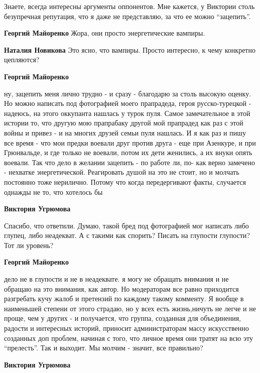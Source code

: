 \begin{itemize}
\begin{itemize}
\begin{itemize} %

Знаете, всегда интересны аргументы оппонентов. Мне кажется, у Виктории столь
безупречная репутация, что я даже не представляю, за что ее можно \enquote{зацепить}.


\textbf{Георгий Майоренко}
Жора, они просто энергетические вампиры.

\textbf{Наталия Новикова} Это ясно, что вампиры. Просто интересно, к чему конкретно цепляются?

\textbf{Георгий Майоренко} 

ну, зацепить меня лично трудно - и сразу - благодарю за столь высокую оценку.
Но можно написать под фотографией моего прапрадеда, героя русско-турецкой -
надеюсь, на этого оккупанта нашлась у турок пуля. Самое замечательное в этой
истории то, что другую мою прапрабаку другой мой прапрадед как раз с этой войны
и привез - и на многих друзей семьи пуля нашлась. И я как раз и пишу все время
- что мои предки воевали друг против друга - еще при Азенкуре, и при
Грюнвальде, и где только не воевали, потом их дети женились, а их внуки опять
воевали. Так что дело в желании зацепить - по работе ли, по- как верно замечено
- нехватке энергетической. Реагировать душой на это не стоит, но и молчать
постоянно тоже нерилично. Потому что когда передергивают факты, случается
однажды не то, что хотелось бы

\textbf{Виктория Угрюмова} 

Спасибо, что ответили. Думаю, такой бред под фотографией мог написать либо
глупец, либо неадекват. А с такими как спорить? Писать на глупости глупости?
Тот ли уровень?

\textbf{Георгий Майоренко} 

дело не в глупости и не в неадеквате. я могу не обращать внимания и не обращаю
на это внимания, как автор. Но модераторам все равно приходится разгребать кучу
жалоб и претензий по каждому такому комменту. Я вообще в наименьшей степени от
этого страдаю, но у всех есть жизнь,ничуть не легче и не проще, чем у других -
и получается, что группа, созданная для объединения, радости и интересных
историй, приносит администраторам массу искусственно созданных доп проблем,
начиная с того, что личное время они тратят на всю эту \enquote{прелесть}. Так и
выходит. Мы молчим - значит, все правильно?

\textbf{Виктория Угрюмова} 


\end{itemize}
\end{itemize}
\end{itemize}
